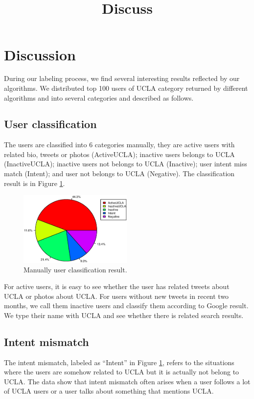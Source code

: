 \documentclass{article}
\begin{document}
\title{Discuss}
\maketitle \else \fi

\section{Discussion}\label{sec:discussion}
During our labeling process, we find several interesting results reflected by our algorithms. We distributed top 100 users of UCLA category returned by different algorithms and into several categories and described as follows.

\subsection{User classification}
The users are classified into $6$ categories manually, they are active users with related bio, tweets or photos (ActiveUCLA); inactive users belongs to UCLA (InactiveUCLA); inactive users not belongs to UCLA (Inactive); user intent miss match (Intent); and user not belongs to UCLA (Negative). The classification result is in Figure \ref{fig:userclass}.

\begin{figure}[h]
\centering
\includegraphics[width=0.5\textwidth]{experiment/uc.eps}
\caption{Manually user classification result.}
\label{fig:userclass}
\end{figure}

For active users, it is easy to see whether the user has related tweets about UCLA or photos about UCLA. For users without new tweets in recent two months, we call them inactive users and classify them according to Google result. We type their name with UCLA and see whether there is related search results.

\subsection{Intent mismatch}
The intent mismatch, labeled as ``Intent'' in Figure \ref{fig:userclass}, refers to the situations where the users are somehow related to UCLA but it is actually not belong to UCLA. The data show that intent mismatch often arises when a user follows a lot of UCLA users or a user talks about something that mentions UCLA.
\end{document}
